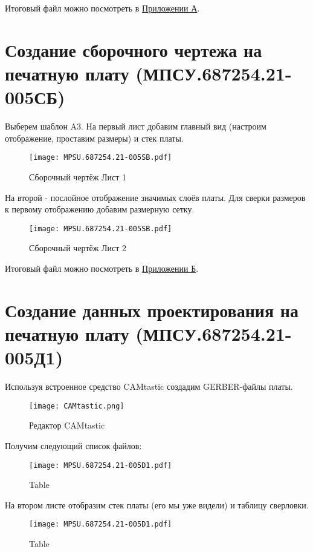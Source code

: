 Итоговый файл можно посмотреть в \hyperref[chap:appA]{Приложении А}.
\section[Создание сборочного чертежа на печатную плату]{Создание сборочного чертежа на печатную плату (МПСУ.687254.21-005СБ)}

Выберем шаблон A3. На первый лист добавим главный вид (настроим отображение, проставим размеры) и стек платы. 
\begin{figure}[H]
	\centering
	\texttt{[image: MPSU.687254.21-005SB.pdf]}
	\caption{Сборочный чертёж Лист 1}%
	\label{fig:PCB_SB1}
\end{figure}
На второй - послойное отображение значимых слоёв платы. Для сверки размеров к первому отображению добавим размерную сетку.
\begin{figure}[H]
	\centering
	\texttt{[image: MPSU.687254.21-005SB.pdf]} 
	\caption{Сборочный чертёж Лист 2}%
	\label{fig:PCB_SB2}
\end{figure}
Итоговый файл можно посмотреть в \hyperref[chap:appB]{Приложении Б}.

\section[Создание данных проектирования на печатную плату]{Создание данных проектирования на печатную плату (МПСУ.687254.21-005Д1)}

Используя встроенное средство CAMtastic создадим GERBER-файлы платы.

\begin{figure}[H]
	\centering
	\texttt{[image: CAMtastic.png]}
	\caption{Редактор CAMtastic}%
	\label{fig:CAM}
\end{figure}

Получим следующий список файлов:

\begin{figure}[H]
	\centering
	\texttt{[image: MPSU.687254.21-005D1.pdf]}
	\caption{Table}%
	\label{fig:PCBData}
\end{figure}

На втором листе отобразим стек платы (его мы уже видели) и таблицу сверловки.

\begin{figure}[H]
	\centering
	\texttt{[image: MPSU.687254.21-005D1.pdf]}
	\caption{Table}%
	\label{fig:DrillData}
\end{figure}

